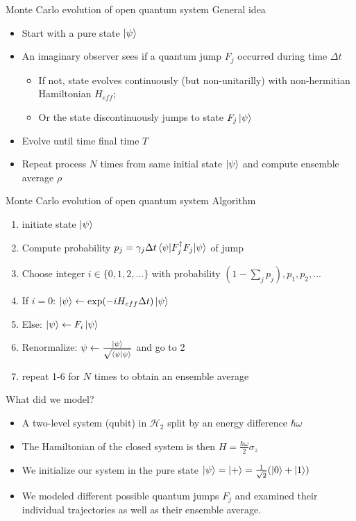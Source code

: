 \documentclass{beamer}
\begin{document}
\begin{frame}{Monte Carlo evolution of open quantum system}
	General idea
	\begin{itemize}
		\item Start with a pure state $\ket{\psi}$ 
		\item An imaginary observer sees if a quantum jump $F_j$ occurred during time $\Delta t$ 
		\begin{itemize}
			\item If not, state evolves continuously (but non-unitarilly) with non-hermitian Hamiltonian $H_{eff}$;
			\item Or the state discontinuously jumps to state $F_j \ket{\psi}$
		\end{itemize}
		\item Evolve until time final time $T$
		\item Repeat process $N$ times from same initial state $\ket{\psi}$ and compute ensemble average $\rho$
	\end{itemize}
\end{frame}


\begin{frame}{Monte Carlo evolution of open quantum system}
		Algorithm 
		\begin{enumerate}
			\item initiate state $\ket{\psi}$
			\item Compute probability $p_j = \gamma_j \Delta t \braket{\psi | F_j^\dagger F_j | \psi} $ of jump
			\item Choose integer $i \in \{0,1,2,...\}$ with probability $(1 - \sum_j p_j), p_1, p_2,...$
			\item If $i = 0$:  $\ket{\psi} \leftarrow \exp(-iH_{eff}\Delta t)\ket{\psi}$
			\item Else: $\ket{\psi} \leftarrow F_i \ket{\psi}$
			\item Renormalize: $\psi \leftarrow \frac{\ket{\psi}}{\sqrt{\braket{\psi|\psi}}}$ and go to 2 
			\item repeat 1-6 for $N$ times to obtain an ensemble average
		\end{enumerate}
\end{frame}


\begin{frame}{What did we model?}
	\begin{itemize}
		\item A two-level system (qubit) in $\mathcal{H}_2$ split by an energy difference $\hbar \omega$
		\item The Hamiltonian of the closed system is then $H = \frac{\hbar \omega}{2} \sigma_z$
		\item We initialize our system in the pure state $\ket{\psi} = \ket{+} = \frac{1}{\sqrt{2}} (\ket{0} + \ket{1})$
		\item We modeled different possible quantum jumps $F_j$ and examined their individual trajectories as well as their ensemble average.
	\end{itemize}
\end{frame}
\end{document}
